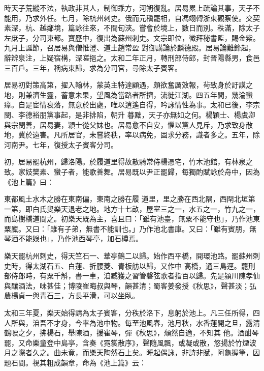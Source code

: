 \begin{pinyinscope}
 時天子荒縱不法，執政非其人，制御乖方，河朔復亂。居易累上疏論其事，天子不能用，乃求外任。七月，除杭州刺史。俄而元稹罷相，自馮翊轉浙東觀察使。交契素深，杭、越鄰境，篇詠往來，不間旬浹。嘗會於境上，數日而別。秩滿，除太子左庶子，分司東都。寶歷中，復出為蘇州刺史。文宗即位，徵拜秘書監，賜金紫。九月上誕節，召居易與僧惟澄、道土趙常盈
 對御講論於麟德殿。居易論難鋒起，辭辨泉注，上疑宿構，深嗟挹之。太和二年正月，轉刑部侍郎，封晉陽縣男，食邑三百戶。三年，稱病東歸，求為分司官，尋除太子賓客。



 居易初對策高第，擢入翰林，蒙英主特達顧遇，頗欲奮厲效報，茍致身於訏謨之地，則兼濟生靈，蓄意未果，望風為當路者所擠，流徙江湖。四五年間，幾淪蠻瘴。自是宦情衰落，無意於出處，唯以逍遙自得，吟詠情性為事。太和已後，李宗閔、李德裕朋黨事起，是非排陷，朝升
 暮黜，天子亦無如之何。楊穎士、楊虞卿與宗閔善，居易妻，穎士從父妹也。居易愈不自安，懼以黨人見斥，乃求致身散地，冀於遠害。凡所居官，未嘗終秩，率以病免，固求分務，識者多之。五年，除河南尹。七年，復授太子賓客分司。



 初，居易罷杭州，歸洛陽。於履道里得故散騎常侍楊憑宅，竹木池館，有林泉之致。家妓樊素、蠻子者，能歌善舞。居易既以尹正罷歸，每獨酌賦詠於舟中，因為《池上篇》曰：



 東都風土水木之勝在東南偏，東南之勝在履
 道里，里之勝在西北隅，西閈北垣第一第，即白氏叟樂天退老之地。地方十七畝，屋室三之一，水五之一，竹九之一，而島樹橋道間之。初樂天既為主，喜且曰：「雖有池臺，無粟不能守也」，乃作池東粟廩。又曰：「雖有子弟，無書不能訓也。」乃作池北書庫。又曰：「雖有賓朋，無琴酒不能娛也」，乃作池西琴亭，加石樽焉。



 樂天罷杭州刺史，得天竺石一、華亭鶴二以歸。始作西平橋，開環池路。罷蘇州刺史時，得太湖石五、白蓮、折腰菱、青板舫以歸，又作中
 高橋，通三島逕。罷刑部侍郎時，有粟千斛，書一車，洎臧獲之習管磬弦歌者指百以歸。先是潁川陳孝仙與釀酒法，味甚佳；博陵崔晦叔與琴，韻甚清；蜀客姜發授《秋思》，聲甚淡；弘農楊貞一與青石三，方長平滑，可以坐臥。



 太和三年夏，樂天始得請為太子賓客，分秩於洛下，息躬於池上。凡三任所得，四人所與，洎吾不才身，今率為池中物。每至池風春，池月秋，水香蓮開之旦，露清鶴唳之夕，拂楊石，舉陳酒，援崔琴，彈《秋思》，頹然自適，不知其
 他。酒酣琴罷，又命樂童登中島亭，含奏《霓裳散序》，聲隨風飄，或凝或散，悠揚於竹煙波月之際者久之。曲未竟，而樂天陶然石上矣。睡起偶詠，非詩非賦，阿龜握筆，因題石間。視其粗成韻章，命為《池上篇》云：




\end{pinyinscope}

